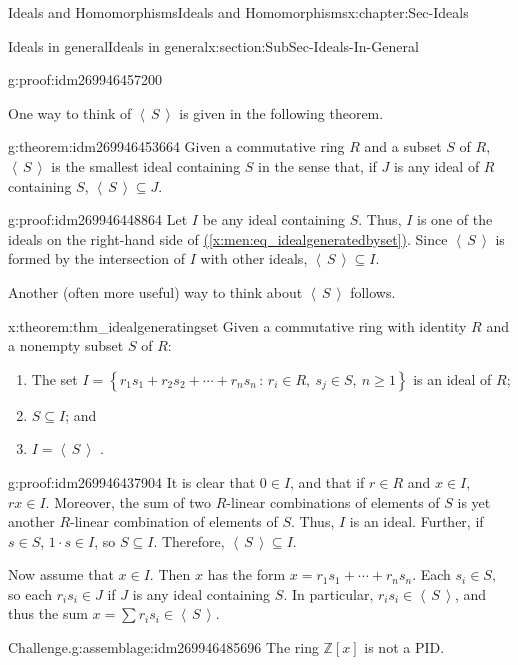 \documentclass[oneside,10pt,]{book}
\numberwithin{equation}{section}
\renewcommand{\ge}{\geqslant}
\newcommand{\ideal}[1]{\left\langle\, #1 \,\right\rangle}
\newcommand{\setof}[2]{{\left\{#1\,\colon\,#2\right\}}}
\def\Z{{\mathbb Z}}
\begin{document}
\begin{chapterptx}{Ideals and Homomorphisms}{}{Ideals and Homomorphisms}{}{}{x:chapter:Sec-Ideals}
\begin{sectionptx}{Ideals in general}{}{Ideals in general}{}{}{x:section:SubSec-Ideals-In-General}
\begin{proofptx}{}{g:proof:idm269946457200}
\end{proofptx}
One way to think of \(\ideal{S}\) is given in the following theorem.%
\begin{theorem}{}{}{g:theorem:idm269946453664}%
Given a commutative ring \(R\) and a subset \(S\) of \(R\), \(\ideal{S}\) is the smallest ideal containing \(S\) in the sense that, if \(J\) is any ideal of \(R\) containing \(S\), \(\ideal{S}\subseteq J\).%
\end{theorem}
\begin{proofptx}{}{g:proof:idm269946448864}
Let \(I\) be any ideal containing \(S\). Thus, \(I\) is one of the ideals on the right-hand side of \hyperref[x:men:eq_idealgeneratedbyset]{(\ref{x:men:eq_idealgeneratedbyset})}. Since \(\ideal{S}\) is formed by the intersection of \(I\) with other ideals, \(\ideal{S}\subseteq I\).%
\end{proofptx}
Another (often more useful) way to think about \(\ideal{S}\) follows.%
\begin{theorem}{}{}{x:theorem:thm_idealgeneratingset}%
Given a commutative ring with identity \(R\) and a nonempty subset \(S\) of \(R\):%
\begin{enumerate}
\item{}The set \(I = \setof{r_1 s_1 + r_2 s_2 + \cdots + r_n s_n}{r_i\in R, \ s_j \in S,\ n\ge 1}\) is an ideal of \(R\);%
\item{}\(S\subseteq I\); and%
\item{}\(\displaystyle I = \ideal{S}\)%
.\end{enumerate}
%
\end{theorem}
\begin{proofptx}{}{g:proof:idm269946437904}
It is clear that \(0\in I\), and that if \(r\in R\) and \(x\in I\), \(rx\in I\). Moreover, the sum of two \(R\)-linear combinations of elements of \(S\) is yet another \(R\)-linear combination of elements of \(S\). Thus, \(I\) is an ideal. Further, if \(s\in S\), \(1\cdot s \in I\), so \(S\subseteq I\). Therefore, \(\ideal{S}\subseteq I\).%
\par
Now assume that \(x\in I\). Then \(x\) has the form \(x = r_1 s_1 + \cdots + r_n s_n\). Each \(s_i \in S\), so each \(r_i s_i \in J\) if \(J\) is any ideal containing \(S\). In particular, \(r_i s_i \in \ideal{S}\), and thus the sum \(x = \sum r_i s_i \in \ideal{S}\).%
\end{proofptx}
\label{g:notation:idm269946488672}%
\begin{assemblage}{Challenge.}{g:assemblage:idm269946485696}%
The ring \(\Z[x]\) is not a PID.%

\end{assemblage}
\end{sectionptx}
\end{chapterptx}
\end{document}
